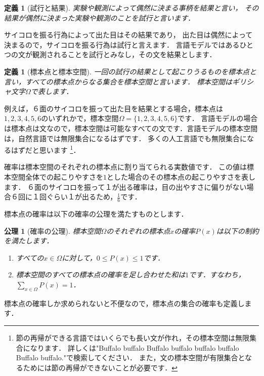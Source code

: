 \documentclass[11pt]{report}
\newtheorem{definition}[theorem]{定義}
\newtheorem{axiom}[theorem]{公理}
\begin{document}
\begin{definition}[試行と結果]
	実験や観測によって偶然に決まる事柄を結果と言い，
	その結果が偶然に決まった実験や観測のことを試行と言います．
\end{definition}

サイコロを振る行為によって出た目はその結果であり，
出た目は偶然によって決まるので，サイコロを振る行為は試行と言えます．
言語モデルではあるひとつの文が観測されることを試行とみなし，その文を結果とします．

\begin{definition}[標本点と標本空間]
	一回の試行の結果として起こりうるものを標本点と言い，すべての標本点からなる集合を標本空間と言います．
	標本空間はギリシャ文字$\Omega$で表します．
\end{definition}

例えば，６面のサイコロを振って出た目を結果とする場合，標本点は$1,2,3,4,5,6$のいずれかで，標本空間$\Omega = \{1,2,3,4,5,6\}$です．
言語モデルの場合は標本点は文なので，標本空間は可能なすべての文です．言語モデルの標本空間は，自然言語では無限集合になるはずです．
多くの人工言語でも無限集合になるはずだと思います
\footnote{節の再帰ができる言語ではいくらでも長い文が作れ，その標本空間は無限集合になります．
詳しくは"Buffalo buffalo Buffalo buffalo buffalo buffalo Buffalo buffalo."で検索してください．
また，文の標本空間が有限集合となるためには節の再帰ができないことが必要です．}．

確率は標本空間のそれぞれの標本点に割り当てられる実数値です．
この値は標本空間全体での起こりやすさを$1$とした場合のその標本点の起こりやすさを表します．
６面のサイコロを振って１が出る確率は，目の出やすさに偏りがない場合６回に１回ぐらい１が出るため，$\frac{1}{6}$です．

標本点の確率は以下の確率の公理を満たすものとします．

\begin{axiom}[確率の公理]
	標本空間$\Omega$のそれぞれの標本点$x$の確率$P(x)$は以下の制約を満たします．
	\begin{enumerate}
		\item すべての$x \in \Omega$に対して，$0 \leq P(x) \leq 1$です．
		\item 標本空間のすべての標本点の確率を足し合わせた和は$1$です．すなわち，$\displaystyle \sum_{x \in \Omega} P(x) = 1$．
	\end{enumerate}
\end{axiom}

標本点の確率しか求められないと不便なので，標本点の集合の確率も定義します．
\end{document}
